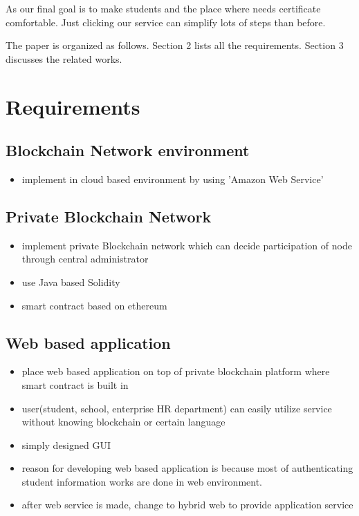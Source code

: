 \documentclass[conference]{IEEEtran}
\begin{document}
As our final goal is to make students and the place where needs certificate comfortable. Just clicking our service can simplify lots of steps than before.

The paper is organized as follows. Section 2 lists all the requirements. Section 3 discusses the related works. 

\section{Requirements}

\subsection{Blockchain Network environment}
\begin{itemize}
\item implement in cloud based environment by using 'Amazon Web Service'
\end{itemize}

\subsection{Private Blockchain Network}
\begin{itemize}
\item implement private Blockchain network which can decide participation of node through central administrator
\item use Java based Solidity 
\item smart contract based on ethereum
\end{itemize}

\subsection{Web based application}
\begin{itemize}
\item place web based application on top of private blockchain platform where smart contract is built in
\item user(student, school, enterprise HR department) can easily utilize service without knowing blockchain or certain language
\item simply designed GUI
\item reason for developing web based application is because most of authenticating student information works are done in web environment. 
\item after web service is made, change to hybrid web to provide application service 
\end{itemize}
\end{document}
